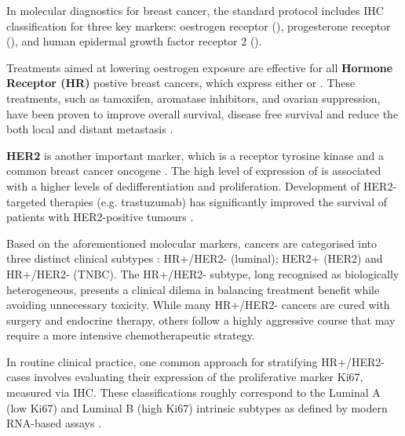 In molecular diagnostics for breast cancer, the standard protocol includes \ac{IHC} classification for three key markers: oestrogen receptor (), progesterone receptor (), and human epidermal growth factor receptor 2 ().

Treatments aimed at lowering oestrogen exposure are effective for all \textbf{Hormone Receptor (HR)} postive breast cancers, which express either  or . These treatments, such as tamoxifen, aromatase inhibitors, and ovarian suppression, have been proven to improve overall survival, disease free survival and reduce the both local and distant metastasis \parencite{Early_Breast_Cancer_Trialists_Collaborative_Group_EBCTCG2005-mk}.

\textbf{HER2} is another important marker, which is a receptor tyrosine kinase and a common breast cancer oncogene . The high level of expression of  is associated with a higher levels of dedifferentiation and proliferation. Development of HER2-targeted therapies (e.g. trastuzumab) has significantly improved the survival of patients with HER2-positive tumours \parencite{Slamon2001-qs}. 

Based on the aforementioned molecular markers, cancers are categorised into three distinct clinical subtypes : HR+/HER2- (luminal); HER2+ (HER2) and HR+/HER2- (TNBC). The HR+/HER2- subtype, long recognised as biologically heterogeneous, presents a clinical dilema in balancing treatment benefit while avoiding unnecessary toxicity. While many HR+/HER2- cancers are cured with surgery and endocrine therapy, others follow a highly aggressive course that may require a more intensive chemotherapeutic strategy.


In routine clinical practice, one common approach for stratifying HR+/HER2- cases involves evaluating their expression of the proliferative marker Ki67, measured via \ac{IHC}. These classifications roughly correspond to the Luminal A (low Ki67) and Luminal B (high Ki67) intrinsic subtypes as defined by modern RNA-based assays .

